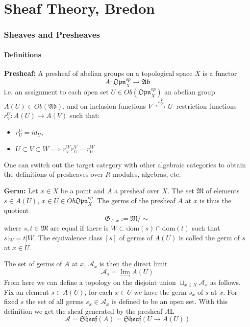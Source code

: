 \part{Sheaf Theory, Bredon}

\section{Sheaves and Presheaves}
\subsection{Definitions}
\begin{definition}
    \textbf{Presheaf: }A presheaf of abelian groups on a topological space $X$ is a functor
    \[A: \mathfrak{Opn}_X^{op} \to \mathfrak{Ab}\]
    i.e. an assignment to each open set $U \in Ob (\mathfrak{Opn}_X^{op})$ an abelian group $A(U) \in Ob(\mathfrak{Ab})$, and on inclusion functions $V \xhookrightarrow{\iota^V_U} U$ restriction functions $r^U_V: A(U) \to A(V)$ such that:
    \begin{itemize}
        \item $r^U_U = id_U$,
        \item $U \subset V \subset W \implies r^W_V r^V_U = r^W_U$
    \end{itemize}
\end{definition}

One can switch out the target category with other algebraic categories to obtain the definitions of presheaves over $R$-modules, algebras, etc. 

\begin{definition}
    \textbf{Germ: }Let $x \in X$ be a point and $A$ a presheaf over $X$. The set $\mathfrak{M}$ of elements $s \in A(U)$, $x \in U \in Ob \mathfrak{Opn}_X^{op}$. The germs of the presheaf $A$ at $x$ is thus the quotient   
    \[\mathfrak{G}_{A,x}:= \mathfrak{M}/\sim \]
    where $s,t \in \mathfrak{M}$ are equal if there is $W \subset \text{dom}(s) \cap \text{dom}(t)$ such that $s|_W = t|W$. The equivalence class $[s]$ of germs of $A(U)$ is called the germ of $s$ at $x \in U$.
\end{definition}

The set of germs of $A$ at $x$, $\mathcal{A}_x$ is then the direct limit
\[\mathcal{A}_s = \lim_{\to} A(U)\]
From here we can define a topology on the disjoint union $\sqcup_{x\in X} \mathcal{A}_x$ as follows. Fix an element $s\in A(U)$, for each $x \in U$ we have the germ $s_x$ of $s$ at $x$. For fixed $s$ the set of all germs $s_x \in \mathcal{A}_x$ is defined to be an open set. With this definition we get the sheaf generated by the presheaf $A$L
\[\mathcal{A} = \mathfrak{Sheaf}(A) = \mathfrak{Sheaf}(U \to A(U))\]

